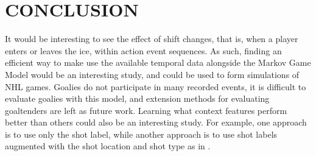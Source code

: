 \documentclass[]{article}
\begin{document}








\section{CONCLUSION}

It would be interesting to see the effect of shift changes, that is, when a player enters or leaves the ice, within action event sequences. As such, finding an efficient way to make use the available temporal data alongside the Markov Game Model would be an interesting study, and could be used to form simulations of NHL games. Goalies do not participate in many recorded events, it is difficult to evaluate goalies with this model, and extension methods for evaluating goaltenders are left as future work. Learning what context features perform better than others could also be an interesting study. For example, one approach is to use only the shot label, while another approach is to use shot labels augmented with the shot location and shot type as in \citep{Krzywicki2005}.
\end{document}
